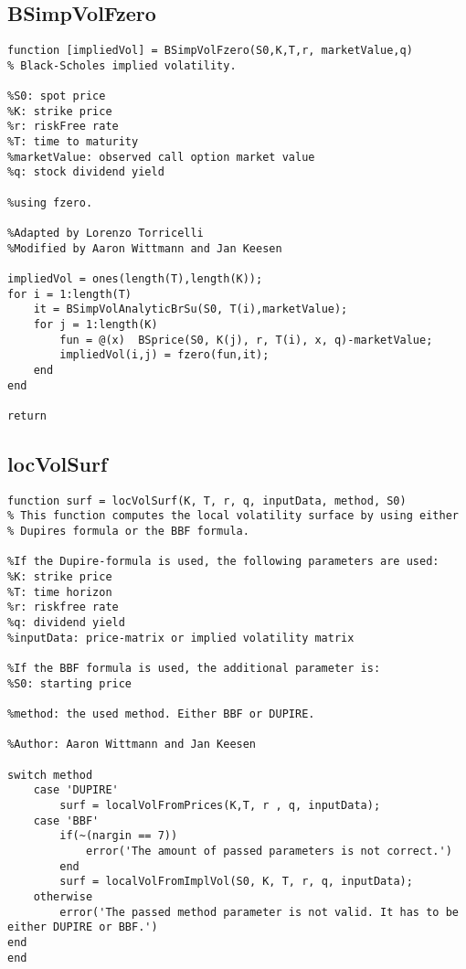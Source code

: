\subsection*{BSimpVolFzero}
\begin{verbatim}
function [impliedVol] = BSimpVolFzero(S0,K,T,r, marketValue,q)
% Black-Scholes implied volatility.

%S0: spot price
%K: strike price
%r: riskFree rate
%T: time to maturity
%marketValue: observed call option market value
%q: stock dividend yield

%using fzero.

%Adapted by Lorenzo Torricelli
%Modified by Aaron Wittmann and Jan Keesen

impliedVol = ones(length(T),length(K));
for i = 1:length(T)
    it = BSimpVolAnalyticBrSu(S0, T(i),marketValue);
    for j = 1:length(K)
        fun = @(x) 	BSprice(S0, K(j), r, T(i), x, q)-marketValue;
        impliedVol(i,j) = fzero(fun,it);
    end
end

return
\end{verbatim}

\subsection*{locVolSurf}
\begin{verbatim}
function surf = locVolSurf(K, T, r, q, inputData, method, S0)
% This function computes the local volatility surface by using either
% Dupires formula or the BBF formula.

%If the Dupire-formula is used, the following parameters are used:
%K: strike price
%T: time horizon
%r: riskfree rate
%q: dividend yield
%inputData: price-matrix or implied volatility matrix

%If the BBF formula is used, the additional parameter is:
%S0: starting price

%method: the used method. Either BBF or DUPIRE.

%Author: Aaron Wittmann and Jan Keesen

switch method
    case 'DUPIRE'
        surf = localVolFromPrices(K,T, r , q, inputData);
    case 'BBF'
        if(~(nargin == 7))
            error('The amount of passed parameters is not correct.')
        end
        surf = localVolFromImplVol(S0, K, T, r, q, inputData);
    otherwise
        error('The passed method parameter is not valid. It has to be either DUPIRE or BBF.')
end
end
\end{verbatim}

